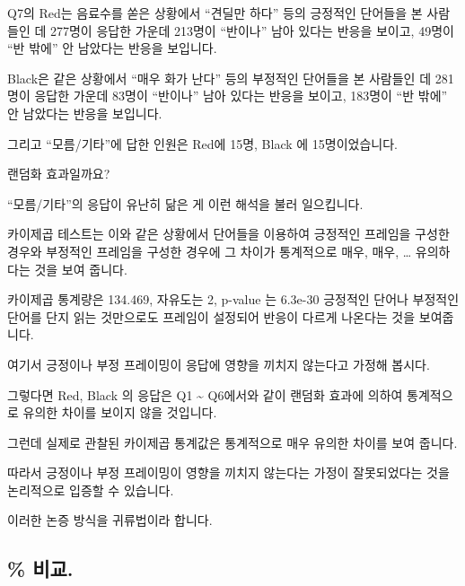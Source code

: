 \documentclass[
]{book}
\begin{document}
Q7의 Red는 음료수를 쏟은 상황에서 ``견딜만 하다'' 등의 긍정적인 단어들을 본 사람들인 데 277명이 응답한 가운데 213명이 ``반이나'' 남아 있다는 반응을 보이고, 49명이 ``반 밖에'' 안 남았다는 반응을 보입니다.

Black은 같은 상황에서 ``매우 화가 난다'' 등의 부정적인 단어들을 본 사람들인 데 281명이 응답한 가운데 83명이 ``반이나'' 남아 있다는 반응을 보이고, 183명이 ``반 밖에'' 안 남았다는 반응을 보입니다.

그리고 ``모름/기타''에 답한 인원은 Red에 15명, Black 에 15명이었습니다.

랜덤화 효과일까요?

``모름/기타''의 응답이 유난히 닮은 게 이런 해석을 불러 일으킵니다.

카이제곱 테스트는 이와 같은 상황에서 단어들을 이용하여 긍정적인 프레임을 구성한 경우와 부정적인 프레임을 구성한 경우에 그 차이가 통계적으로 매우, 매우, \ldots{} 유의하다는 것을 보여 줍니다.

카이제곱 통계량은 134.469, 자유도는 2, p-value 는 6.3e-30
긍정적인 단어나 부정적인 단어를 단지 읽는 것만으로도 프레임이 설정되어 반응이 다르게 나온다는 것을 보여줍니다.

여기서 긍정이나 부정 프레이밍이 응답에 영향을 끼치지 않는다고 가정해 봅시다.

그렇다면 Red, Black 의 응답은 Q1 \textasciitilde{} Q6에서와 같이 랜덤화 효과에 의하여 통계적으로 유의한 차이를 보이지 않을 것입니다.

그런데 실제로 관찰된 카이제곱 통계값은 통계적으로 매우 유의한 차이를 보여 줍니다.

따라서 긍정이나 부정 프레이밍이 영향을 끼치지 않는다는 가정이 잘못되었다는 것을 논리적으로 입증할 수 있습니다.

이러한 논증 방식을 귀류법이라 합니다.

\subsection{\% 비교.}\label{uxbe44uxad50.-1}
\end{document}
